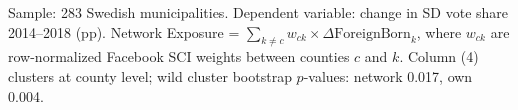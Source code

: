 \begin{table}[htbp]
   \par \raggedright 
   Sample: 283 Swedish municipalities. Dependent variable: change in SD vote share 2014--2018 (pp). Network Exposure = $\sum_{k \neq c} w_{ck} \times \Delta\text{ForeignBorn}_k$, where $w_{ck}$ are row-normalized Facebook SCI weights between counties $c$ and $k$. Column (4) clusters at county level; wild cluster bootstrap $p$-values: network 0.017, own 0.004.
\end{table}


